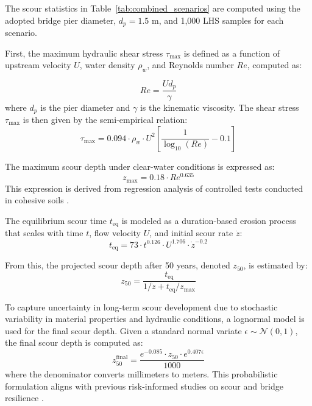 \documentclass[authoryear,preprint,review,12pt]{elsarticle}
\begin{document}
The scour statistics in Table~\ref{tab:combined_scenarios} are computed using the adopted bridge pier diameter, $d_p = 1.5$ m, and 1,000 LHS samples for each scenario.

First, the maximum hydraulic shear stress $\tau_{\text{max}}$ is defined as a function of upstream velocity $U$, water density $\rho_w$, and Reynolds number $Re$, computed as:

\begin{equation}
Re = \frac{U d_p}{\gamma}
\label{eq:reynolds}
\end{equation}
where $d_p$ is the pier diameter and $\gamma$ is the kinematic viscosity. The shear stress $\tau_{\text{max}}$ is then given by the semi-empirical relation:
\begin{equation}
\tau_{\text{max}} = 0.094 \cdot \rho_w \cdot U^2 \left[ \frac{1}{\log_{10}(Re)} - 0.1 \right]
\label{eq:shear}
\end{equation}

The maximum scour depth under clear-water conditions is expressed as:
\begin{equation}
z_{\text{max}} = 0.18 \cdot Re^{0.635}
\label{eq:zmax}
\end{equation}
This expression is derived from regression analysis of controlled tests conducted in cohesive soils \citep{Gudavalli1998}.

The equilibrium scour time $t_{\text{eq}}$ is modeled as a duration-based erosion process that scales with time $t$, flow velocity $U$, and initial scour rate $\dot{z}$:
\begin{equation}
t_{\text{eq}} = 73 \cdot t^{0.126} \cdot U^{1.706} \cdot \dot{z}^{-0.2}
\label{eq:teq}
\end{equation}

From this, the projected scour depth after 50 years, denoted $z_{50}$, is estimated by:
\begin{equation}
z_{50} = \frac{t_{\text{eq}}}{1/\dot{z} + t_{\text{eq}}/z_{\text{max}}}
\label{eq:z50}
\end{equation}

To capture uncertainty in long-term scour development due to stochastic variability in material properties and hydraulic conditions, a lognormal model is used for the final scour depth. Given a standard normal variate $\epsilon \sim \mathcal{N}(0,1)$, the final scour depth is computed as:
\begin{equation}
z_{50}^{\text{final}} = \frac{e^{-0.085} \cdot z_{50} \cdot e^{0.407 \epsilon}}{1000}
\label{eq:zfinal}
\end{equation}
where the denominator converts millimeters to meters. This probabilistic formulation aligns with previous risk-informed studies on scour and bridge resilience \citep{Alipour2013,Briaud2010}.
\end{document}
